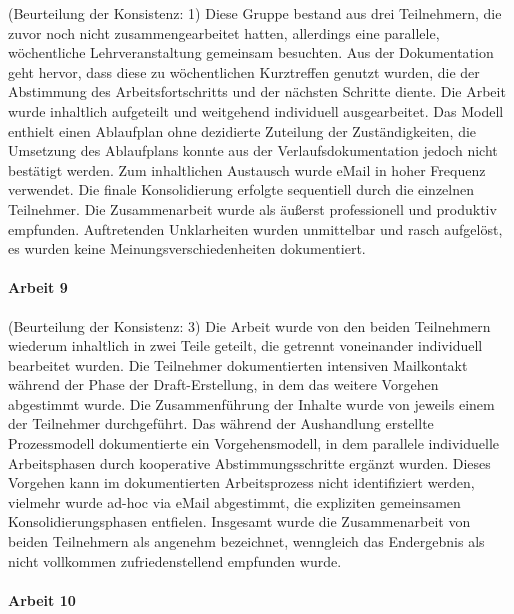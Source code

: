 (Beurteilung der Konsistenz: 1) Diese Gruppe bestand aus drei Teilnehmern, die zuvor noch nicht zusammengearbeitet hatten, allerdings eine parallele, wöchentliche Lehrveranstaltung gemeinsam besuchten. Aus der Dokumentation geht hervor, dass diese zu wöchentlichen Kurztreffen genutzt wurden, die der Abstimmung des Arbeitsfortschritts und der nächsten Schritte diente. Die Arbeit wurde inhaltlich aufgeteilt und weitgehend individuell ausgearbeitet. Das Modell enthielt einen Ablaufplan ohne dezidierte Zuteilung der Zuständigkeiten, die Umsetzung des Ablaufplans konnte aus der Verlaufsdokumentation jedoch nicht bestätigt werden. Zum inhaltlichen Austausch wurde eMail in hoher Frequenz verwendet. Die finale Konsolidierung erfolgte sequentiell durch die einzelnen Teilnehmer. Die Zusammenarbeit wurde als äußerst professionell und produktiv empfunden. Auftretenden Unklarheiten wurden unmittelbar und rasch aufgelöst, es wurden keine Meinungsverschiedenheiten dokumentiert.


\paragraph{Arbeit 9} %
\label{par:arbeit_9}

(Beurteilung der Konsistenz: 3) Die Arbeit wurde von den beiden Teilnehmern wiederum inhaltlich in zwei Teile geteilt, die getrennt voneinander individuell bearbeitet wurden. Die Teilnehmer dokumentierten intensiven Mailkontakt während der Phase der Draft-Erstellung, in dem das weitere Vorgehen abgestimmt wurde. Die Zusammenführung der Inhalte wurde von jeweils einem der Teilnehmer durchgeführt. Das während der Aushandlung erstellte Prozessmodell dokumentierte ein Vorgehensmodell, in dem parallele individuelle Arbeitsphasen durch kooperative Abstimmungsschritte ergänzt wurden. Dieses Vorgehen kann im dokumentierten Arbeitsprozess nicht identifiziert werden, vielmehr wurde ad-hoc via eMail abgestimmt, die expliziten gemeinsamen Konsolidierungsphasen entfielen. Insgesamt wurde die Zusammenarbeit von beiden Teilnehmern als angenehm bezeichnet, wenngleich das Endergebnis als nicht vollkommen zufriedenstellend empfunden wurde.


\paragraph{Arbeit 10} %
\label{par:arbeit_10}

